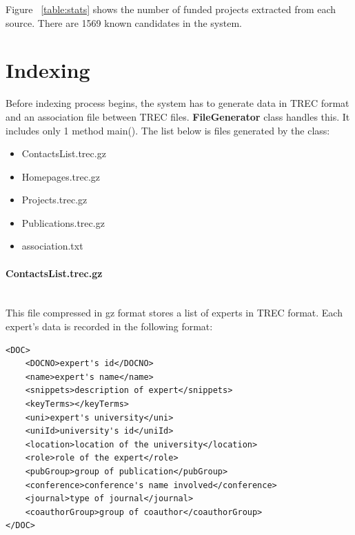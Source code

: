 \begin{table}
\centering
{}
\caption{The number of funded projects extracted from each source} \label{table:stats}
\end{table}
Figure ~\ref{table:stats} shows the number of funded projects extracted from each source. There are 1569 known candidates in the system.

\section{Indexing}

Before indexing process begins, the system has to generate data in TREC format and an association file between TREC files. \textbf{FileGenerator} class
handles this. It includes only 1 method main(). The list below is files generated by the class:
\begin{itemize}
 \item ContactsList.trec.gz
 \item Homepages.trec.gz
 \item Projects.trec.gz
 \item Publications.trec.gz
 \item association.txt
\end{itemize}

\paragraph{ContactsList.trec.gz} \hspace{0pt} \\
This file compressed in gz format stores a list of experts in TREC format. Each expert's data is recorded in the following format:
\begin{verbatim}
<DOC>
	<DOCNO>expert's id</DOCNO>
	<name>expert's name</name>
	<snippets>description of expert</snippets>
	<keyTerms></keyTerms>
	<uni>expert's university</uni>
	<uniId>university's id</uniId>
	<location>location of the university</location>
	<role>role of the expert</role>
	<pubGroup>group of publication</pubGroup>
	<conference>conference's name involved</conference>
	<journal>type of journal</journal>
	<coauthorGroup>group of coauthor</coauthorGroup>
</DOC>
\end{verbatim}

